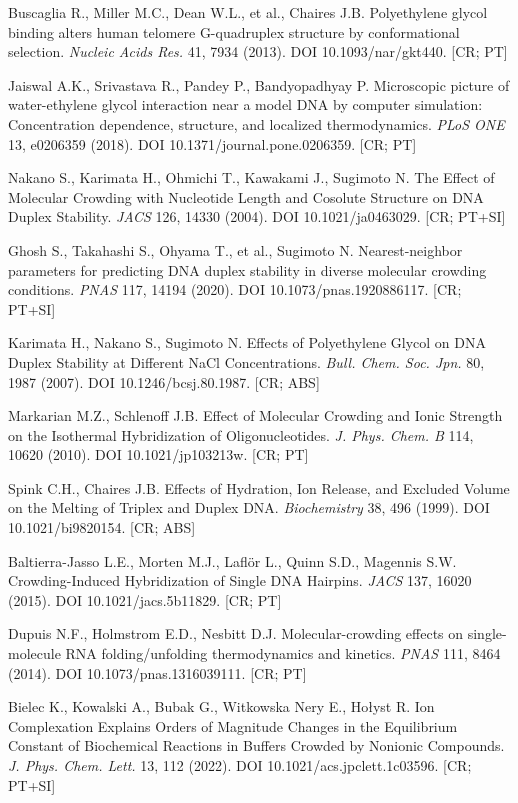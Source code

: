 \documentclass[10pt,a4paper]{article}
\begin{document}
\begin{enumerate}[label={[\arabic*]},ref={\arabic*},leftmargin=*,itemsep=0pt]
\item\label{b:buscaglia} Buscaglia R., Miller M.C., Dean W.L., et al., Chaires J.B. Polyethylene glycol binding alters human telomere G-quadruplex structure by conformational selection. \emph{Nucleic Acids Res.} 41, 7934 (2013). DOI 10.1093/nar/gkt440. [CR; PT]
\item\label{b:jaiswal} Jaiswal A.K., Srivastava R., Pandey P., Bandyopadhyay P. Microscopic picture of water-ethylene glycol interaction near a model DNA by computer simulation: Concentration dependence, structure, and localized thermodynamics. \emph{PLoS ONE} 13, e0206359 (2018). DOI 10.1371/journal.pone.0206359. [CR; PT]
\item\label{b:nakano04} Nakano S., Karimata H., Ohmichi T., Kawakami J., Sugimoto N. The Effect of Molecular Crowding with Nucleotide Length and Cosolute Structure on DNA Duplex Stability. \emph{JACS} 126, 14330 (2004). DOI 10.1021/ja0463029. [CR; PT+SI]
\item\label{b:ghosh20} Ghosh S., Takahashi S., Ohyama T., et al., Sugimoto N. Nearest-neighbor parameters for predicting DNA duplex stability in diverse molecular crowding conditions. \emph{PNAS} 117, 14194 (2020). DOI 10.1073/pnas.1920886117. [CR; PT+SI]
\item\label{b:karimata07} Karimata H., Nakano S., Sugimoto N. Effects of Polyethylene Glycol on DNA Duplex Stability at Different NaCl Concentrations. \emph{Bull. Chem. Soc. Jpn.} 80, 1987 (2007). DOI 10.1246/bcsj.80.1987. [CR; ABS]
\item\label{b:markarian} Markarian M.Z., Schlenoff J.B. Effect of Molecular Crowding and Ionic Strength on the Isothermal Hybridization of Oligonucleotides. \emph{J. Phys. Chem. B} 114, 10620 (2010). DOI 10.1021/jp103213w. [CR; PT]
\item\label{b:spink99} Spink C.H., Chaires J.B. Effects of Hydration, Ion Release, and Excluded Volume on the Melting of Triplex and Duplex DNA. \emph{Biochemistry} 38, 496 (1999). DOI 10.1021/bi9820154. [CR; ABS]
\item\label{b:baltierra} Baltierra-Jasso L.E., Morten M.J., Laflör L., Quinn S.D., Magennis S.W. Crowding-Induced Hybridization of Single DNA Hairpins. \emph{JACS} 137, 16020 (2015). DOI 10.1021/jacs.5b11829. [CR; PT]
\item\label{b:dupuis} Dupuis N.F., Holmstrom E.D., Nesbitt D.J. Molecular-crowding effects on single-molecule RNA folding/unfolding thermodynamics and kinetics. \emph{PNAS} 111, 8464 (2014). DOI 10.1073/pnas.1316039111. [CR; PT]
\item\label{b:bielec22} Bielec K., Kowalski A., Bubak G., Witkowska Nery E., Hołyst R. Ion Complexation Explains Orders of Magnitude Changes in the Equilibrium Constant of Biochemical Reactions in Buffers Crowded by Nonionic Compounds. \emph{J. Phys. Chem. Lett.} 13, 112 (2022). DOI 10.1021/acs.jpclett.1c03596. [CR; PT+SI]

\end{enumerate}
\end{document}
